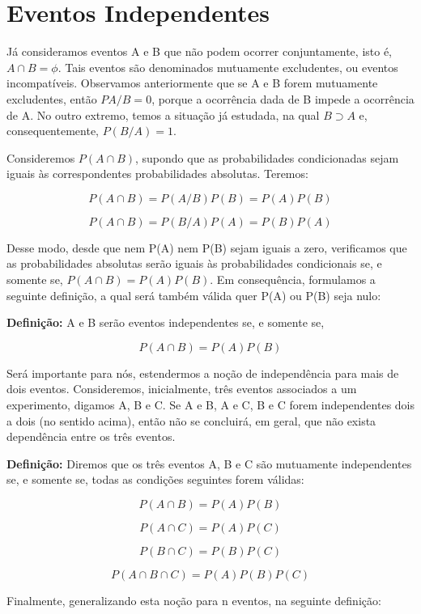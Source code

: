 \section{Eventos Independentes}

Já consideramos eventos A e B que não podem ocorrer conjuntamente,
isto é, $A\cap B = \phi$. Tais eventos são denominados mutuamente
excludentes, ou eventos incompatíveis. Observamos anteriormente
que se A e B forem mutuamente excludentes, então $PA/B=0$, porque
a ocorrência dada de B impede a ocorrência de A. No outro extremo,
temos a situação já estudada, na qual $B \supset A$ e,
consequentemente, $P(B/A)=1$.\vskip0.3cm

Consideremos $P(A \cap B)$, supondo que as probabilidades
condicionadas sejam iguais às correspondentes probabilidades
absolutas. Teremos:

$$
P(A \cap B)= P(A/B)P(B)=P(A)P(B)
$$

$$
P(A \cap B)= P(B/A)P(A)=P(B)P(A)
$$


Desse modo, desde que nem P(A) nem P(B) sejam iguais a zero,
verificamos que as probabilidades absolutas serão iguais às
probabilidades condicionais se, e somente se, $P(A \cap
B)=P(A)P(B)$. Em consequência, formulamos a seguinte definição, a
qual será também válida quer P(A) ou P(B) seja nulo:\vskip0.3cm

\textbf{Definição:} A e B serão eventos independentes se, e
somente se,

$$
P(A \cap B) = P(A)P(B)
$$


Será importante para nós, estendermos a noção de independência
para mais de dois eventos. Consideremos, inicialmente, três
eventos associados a um experimento, digamos A, B e C. Se A e B, A
e C, B e C forem independentes dois a dois (no sentido acima),
então não se concluirá, em geral, que não exista dependência entre
os três eventos.\vskip0.3cm

\textbf{Definição:} Diremos que os três eventos A, B e C são
mutuamente independentes se, e somente se, todas as condições
seguintes forem válidas:

$$
P(A \cap B)=P(A)P(B)
$$

$$
P(A \cap C)=P(A)P(C)
$$

$$
P(B \cap C)=P(B)P(C)
$$

$$
P(A \cap B \cap C)=P(A)P(B)P(C)
$$


Finalmente, generalizando esta noção para n eventos, na seguinte
definição:\vskip0.3cm




